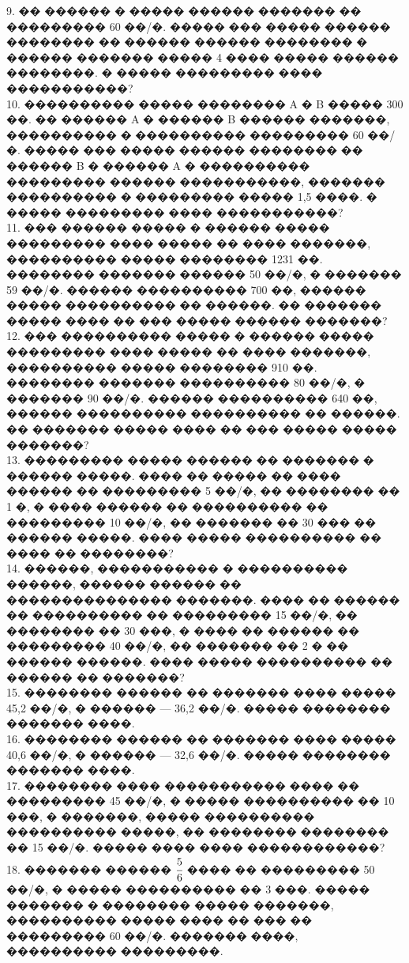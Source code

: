 \documentclass[12pt]{article}
\begin{document}
9. �� ������ � ����� ������ ������� �� ��������� 60 ��/�. ����� ��� ����� ������ �������� �� ������ ������ �������� � ������ ������� ����� 4 ���� ����� ������ ��������. � ����� ��������� ���� �����������?\\
10. ���������� ����� �������� A � B ����� 300 ��. �� ������ A � ������ B ������ �������, ���������� � ���������� ��������� 60 ��/�. ����� ��� ����� ������ �������� �� ������ B � ������ A � ���������� ��������� ������ �����������, ������� ���������� � ��������� ����� 1,5 ����. � ����� ��������� ���� �����������?\\
11. ��� ������ ����� � ������ ����� ��������� ���� ����� �� ���� �������, ���������� ����� �������� 1231 ��. �������� ������� ������ 50 ��/�, � ������� 59 ��/�. ������ ���������� 700 ��, ������ ����� ���������� �� ������. �� ������� ����� ���� �� ��� ����� ������ �������?\\
12. ��� ���������� ����� � ������ ����� ��������� ���� ����� �� ���� �������, ���������� ����� �������� 910 ��. �������� ������� ���������� 80 ��/�, � ������� 90 ��/�. ������ ���������� 640 ��, ������ ���������� ���������� �� ������. �� ������� ����� ���� �� ��� ����� ����� �������?\\
13. ��������� ����� ������ �� ������� � ������ �����. ���� �� ����� �� ���� ������ �� ��������� 5 ��/�, �� �������� �� 1 �, � ���� ������ �� ���������� �� ��������� 10 ��/�, �� ������� �� 30 ��� �� ������ �����. ���� ����� ���������� �� ���� �� ��������?\\
14. ������, ����������� � ���������� ������, ������ ������ �� ��������������� �������. ���� �� ������ �� ���������� �� ��������� 15 ��/�, �� �������� �� 30 ���, � ���� �� ������ �� ��������� 40 ��/�, �� ������� �� 2 � �� ������ ������. ���� ����� ���������� �� ������ �� �������?\\
15. �������� ������ �� ������� ���� ����� 45,2 ��/�, � ������ --- 36,2 ��/�. ����� �������� ������� ����.\\
16. �������� ������ �� ������� ���� ����� 40,6 ��/�, � ������ --- 32,6 ��/�. ����� �������� ������� ����.\\
17. �������� ���� ����������� ���� �� ��������� 45 ��/�, � ����� ���������� �� 10 ���, � �������, ����� ���������� ���������� �����, �� �������� �������� �� 15 ��/�. ����� ���� ���� ������������?\\
18. ������� ������ $\cfrac{5}{6}$ ���� �� ��������� 50 ��/�, � ����� ���������� �� 3 ���. ����� ������� � �������� ����� �������, ���������� ����� ���� �� ��� �� ��������� 60 ��/�. ������� ����, ���������� ���������.\\
\end{document}
